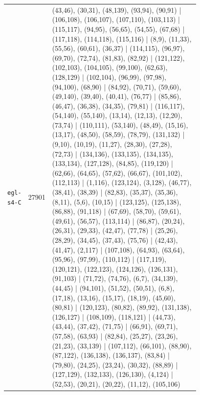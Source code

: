 \begin{landscape}
\begin{longtable}{lr>{\tiny\raggedright\arraybackslash}p{0.78\linewidth}}
\texttt{egl-s4-C} & 27901 & (43,46), (30,31), (48,139), (93,94), (90,91) | (106,108), (106,107), (107,110), (103,113) | (115,117), (94,95), (56,65), (54,55), (67,68) | (117,118), (114,118), (115,116) | (8,9), (11,33), (55,56), (60,61), (36,37) | (114,115), (96,97), (69,70), (72,74), (81,83), (82,92) | (121,122), (102,103), (104,105), (99,100), (62,63), (128,129) | (102,104), (96,99), (97,98), (94,100), (68,90) | (84,92), (70,71), (59,60), (49,140), (39,40), (40,41), (76,77) | (85,86), (46,47), (36,38), (34,35), (79,81) | (116,117), (54,140), (55,140), (13,14), (12,13), (12,20), (73,74) | (110,111), (53,140), (48,49), (15,16), (13,17), (48,50), (58,59), (78,79), (131,132) | (9,10), (10,19), (11,27), (28,30), (27,28), (72,73) | (134,136), (133,135), (134,135), (133,134), (127,128), (84,85), (119,120) | (62,66), (64,65), (57,62), (66,67), (101,102), (112,113) | (1,116), (123,124), (3,128), (46,77), (38,41), (38,39) | (82,83), (35,37), (35,36), (8,11), (5,6), (10,15) | (123,125), (125,138), (86,88), (91,118) | (67,69), (58,70), (59,61), (49,61), (56,57), (113,114) | (86,87), (20,24), (26,31), (29,33), (42,47), (77,78) | (25,26), (28,29), (34,45), (37,43), (75,76) | (42,43), (41,47), (2,117) | (107,108), (64,93), (63,64), (95,96), (97,99), (110,112) | (117,119), (120,121), (122,123), (124,126), (126,131), (91,103) | (71,72), (74,76), (6,7), (34,139), (44,45) | (94,101), (51,52), (50,51), (6,8), (17,18), (13,16), (15,17), (18,19), (45,60), (80,81) | (120,123), (80,82), (89,92), (131,138), (126,127) | (108,109), (118,121) | (44,73), (43,44), (37,42), (71,75) | (66,91), (69,71), (57,58), (63,93) | (82,84), (25,27), (23,26), (21,23), (33,139) | (107,112), (66,101), (88,90), (87,122), (136,138), (136,137), (83,84) | (79,80), (24,25), (23,24), (30,32), (88,89) | (127,129), (132,133), (126,130), (4,124) | (52,53), (20,21), (20,22), (11,12), (105,106) \\[2pt]
\end{longtable}
\endgroup
\end{landscape}
\restoregeometry